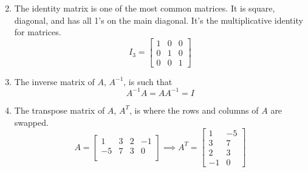 \begin{enumerate}[label=]
\begin{equation*}
		\end{equation*}
	\item The identity matrix is one of the most common matrices. It is square, diagonal, and has all 1's on the main diagonal. It's the multiplicative identity for matrices.
		\begin{equation*}
			I_3 = \begin{bmatrix}
				1 & 0 & 0 \\
				0 & 1 & 0 \\
				0 & 0 & 1
			\end{bmatrix}
		\end{equation*}
	\item The inverse matrix of $A$, $A^{-1}$, is such that
		\begin{equation*}
			A^{-1}A = AA^{-1} = I
		\end{equation*}
	\item The transpose matrix of $A$, $A^T$, is where the rows and columns of $A$ are swapped.
		\begin{equation*}
			A = \begin{bmatrix}
				1 & 3 & 2 & -1 \\
				-5 & 7 & 3 & 0 \\
			\end{bmatrix} \implies A^T = \begin{bmatrix}
				1 & -5 \\
				3 & 7 \\
				2 & 3 \\
				-1 & 0
			\end{bmatrix}
		\end{equation*}
\end{enumerate}